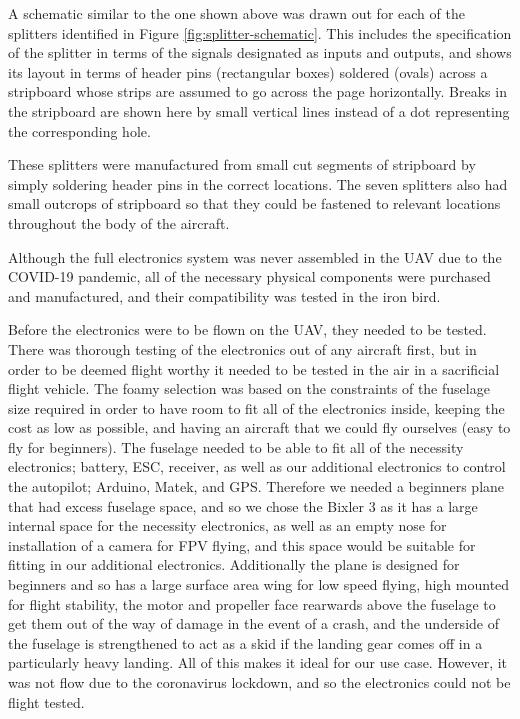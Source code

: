 \documentclass[../../main.tex]{subfiles}
\begin{document}
A schematic similar to the one shown above was drawn out for each of the splitters identified in Figure \ref{fig:splitter-schematic}.
This includes the specification of the splitter in terms of the signals designated as inputs and outputs, and shows its layout in terms of header pins (rectangular boxes) soldered (ovals) across a stripboard whose strips are assumed to go across the page horizontally.
Breaks in the stripboard are shown here by small vertical lines instead of a dot representing the corresponding hole. 

These splitters were manufactured from small cut segments of stripboard by simply soldering header pins in the correct locations.
The seven splitters also had small outcrops of stripboard so that they could be fastened to relevant locations throughout the body of the aircraft. 


Although the full electronics system was never assembled in the UAV due to the COVID-19 pandemic, all of the necessary physical components were purchased and manufactured, and their compatibility was tested in the iron bird. 


Before the electronics were to be flown on the UAV, they needed to be tested.
There was thorough testing of the electronics out of any aircraft first, but in order to be deemed flight worthy it needed to be tested in the air in a sacrificial flight vehicle.
The foamy selection was based on the constraints of the fuselage size required in order to have room to fit all of the electronics inside, keeping the cost as low as possible, and having an aircraft that we could fly ourselves (easy to fly for beginners).
The fuselage needed to be able to fit all of the necessity electronics; battery, ESC, receiver, as well as our additional electronics to control the autopilot; Arduino, Matek, and GPS.
Therefore we needed a beginners plane that had excess fuselage space, and so we chose the Bixler 3 as it has a large internal space for the necessity electronics, as well as an empty nose for installation of a camera for FPV flying, and this space would be suitable for fitting in our additional electronics.
Additionally the plane is designed for beginners and so has a large surface area wing for low speed flying, high mounted for flight stability, the motor and propeller face rearwards above the fuselage to get them out of the way of damage in the event of a crash, and the underside of the fuselage is strengthened to act as a skid if the landing gear comes off in a particularly heavy landing.
All of this makes it ideal for our use case.
However, it was not flow due to the coronavirus lockdown, and so the electronics could not be flight tested. 
\end{document}
